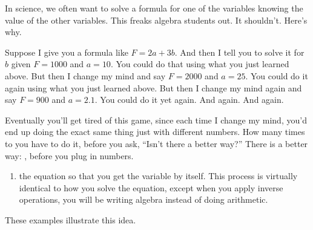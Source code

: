 \documentclass[fleqn,letterpaper,12pt,printwatermark=false]{memoir}
\begin{document}
\begin{myLesson}[][]
    In science,
    we often want to solve a formula for one of the variables
     knowing the value of the other variables.
    This freaks algebra students out. 
    It shouldn't. 
    Here's why.

    Suppose I give you a formula like $F = 2a + 3b$.
    And then I tell you to solve it for $b$ given $F=1000$ and $a=10$.
    You could do that using what you just learned above.
    But then I change my mind and say $F=2000$ and $a=25$.
    You could do it again using what you just learned above.
    But then I change my mind again and say $F=900$ and $a=2.1$.
    You could do it yet again. And again. And again.
    
    Eventually you'll get tired of this game,
    since each time I change my mind, you'd end up doing the exact same thing 
    just with different numbers.
    How many times to you have to do it, before you ask, ``Isn't there a better way?''
    There is a better way: , before you plug in numbers.
\end{myLesson}

\begin{myKeyConcepts}
    \begin{enumerate}
        \item {} the equation so that you get the variable by itself.
        This process is virtually identical to how you solve the equation,
        except when you apply inverse operations, you will be writing algebra instead of doing arithmetic.
    \end{enumerate}
\end{myKeyConcepts}

These examples illustrate this idea.




  
\end{document}
